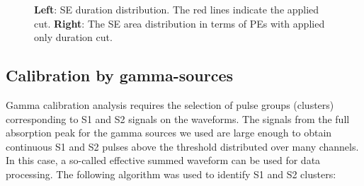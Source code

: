 \documentclass[a4paper,11pt]{article}
\begin{document}
\begin{figure}[htbp]
  \begin{minipage}[ht]{0.49\linewidth}    
  \end{minipage}
  \hfill
  \begin{minipage}[ht]{0.49\linewidth}  
  \end{minipage}
	\caption{\textbf{Left}: SE duration distribution. The red lines indicate the applied cut.  \textbf{Right}: The SE area distribution in terms of PEs with applied only duration cut.}
	\label{img:sespectrum}
\end{figure}

\subsection{Calibration by gamma-sources}
\label{subsec:gamma}
Gamma calibration analysis requires the selection of pulse groups (clusters) corresponding to S1 and S2 signals on the waveforms. 
The signals from the full absorption peak for the gamma sources we used are large enough to obtain continuous S1 and S2 pulses above the threshold distributed over many channels. 
In this case, a so-called effective summed waveform can be used for data processing. The following algorithm was used to identify S1 and S2 clusters:
\end{document}
